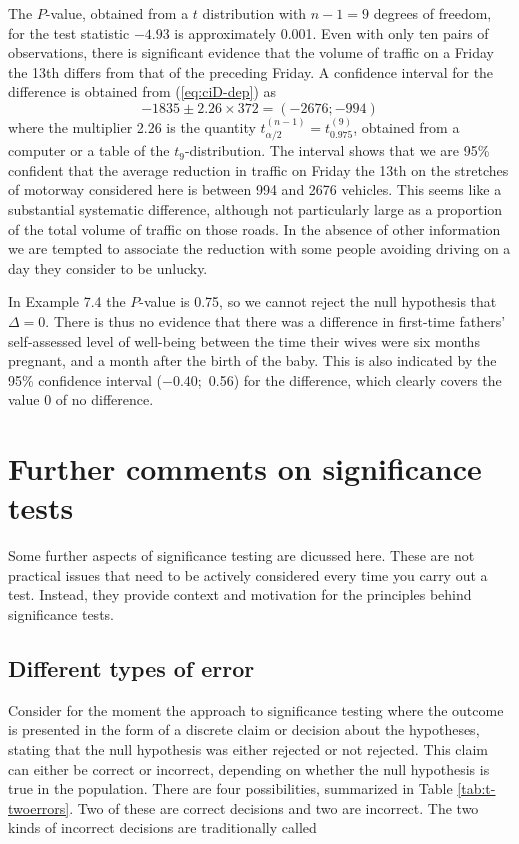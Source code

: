 \documentclass[11pt,a4paper,openany]{book}
\begin{document}
The \(P\)-value, obtained from a \(t\) distribution with \(n-1=9\)
degrees of freedom, for the test statistic \(-4.93\) is approximately
0.001. Even with only ten pairs of observations, there is significant
evidence that the volume of traffic on a Friday the 13th differs from
that of the preceding Friday. A confidence interval for the difference
is obtained from (\ref{eq:ciD-dep}) as
\[-1835 \pm 2.26 \times 372 = (-2676; -994)\] where the multiplier 2.26
is the quantity \(t_{\alpha/2}^{(n-1)}=t_{0.975}^{(9)}\), obtained from
a computer or a table of the \(t_{9}\)-distribution. The interval shows
that we are 95\% confident that the average reduction in traffic on
Friday the 13th on the stretches of motorway considered here is between
994 and 2676 vehicles. This seems like a substantial systematic
difference, although not particularly large as a proportion of the total
volume of traffic on those roads. In the absence of other information we
are tempted to associate the reduction with some people avoiding driving
on a day they consider to be unlucky.

In Example 7.4 the \(P\)-value is 0.75, so we cannot reject the null
hypothesis that \(\Delta=0\). There is thus no evidence that there was a
difference in first-time fathers' self-assessed level of well-being
between the time their wives were six months pregnant, and a month after
the birth of the baby. This is also indicated by the 95\% confidence
interval \mbox{($-0.40$; 0.56)} for the difference, which clearly covers
the value 0 of no difference.

\section{Further comments on significance tests}\label{s-means-tests3}

Some further aspects of significance testing are dicussed here. These
are not practical issues that need to be actively considered every time
you carry out a test. Instead, they provide context and motivation for
the principles behind significance tests.

\subsection{Different types of error}\label{ss-means-tests3-errors}

Consider for the moment the approach to significance testing where the
outcome is presented in the form of a discrete claim or decision about
the hypotheses, stating that the null hypothesis was either rejected or
not rejected. This claim can either be correct or incorrect, depending
on whether the null hypothesis is true in the population. There are four
possibilities, summarized in Table \ref{tab:t-twoerrors}. Two of these
are correct decisions and two are incorrect. The two kinds of incorrect
decisions are traditionally called
\end{document}
